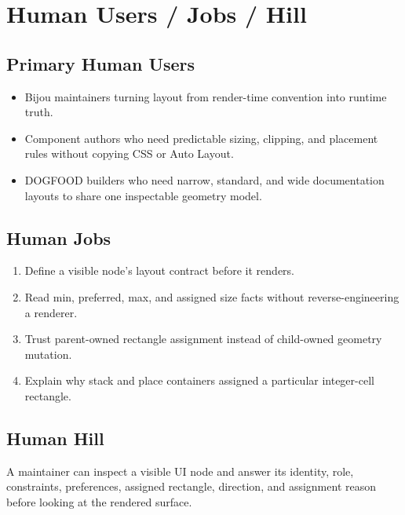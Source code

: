 \section{Human Users / Jobs / Hill}\label{record-163-human-users-jobs-hill}

\subsection{Primary Human Users}\label{record-163-primary-human-users}

\begin{itemize}
\tightlist
\item
  Bijou maintainers turning layout from render-time convention into runtime truth.
\item
  Component authors who need predictable sizing, clipping, and placement rules without copying CSS or Auto Layout.
\item
  DOGFOOD builders who need narrow, standard, and wide documentation layouts to share one inspectable geometry model.
\end{itemize}

\subsection{Human Jobs}\label{record-163-human-jobs}

\begin{enumerate}
\def\labelenumi{\arabic{enumi}.}
\tightlist
\item
  Define a visible node's layout contract before it renders.
\item
  Read min, preferred, max, and assigned size facts without reverse-engineering a renderer.
\item
  Trust parent-owned rectangle assignment instead of child-owned geometry mutation.
\item
  Explain why stack and place containers assigned a particular integer-cell rectangle.
\end{enumerate}

\subsection{Human Hill}\label{record-163-human-hill}

A maintainer can inspect a visible UI node and answer its identity, role, constraints, preferences, assigned rectangle, direction, and assignment reason before looking at the rendered surface.

